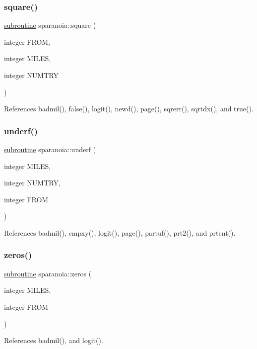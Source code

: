 \mbox{\label{sparanoia_8f90_a12b0d14b130071ecf4cd010e35b092c7}} 
\subsubsection{\texorpdfstring{square()}{square()}}
{\footnotesize\ttfamily \hyperlink{M__stopwatch_83_8txt_acfbcff50169d691ff02d4a123ed70482}{subroutine} sparanoia\+::square (\begin{DoxyParamCaption}\item[{integer}]{F\+R\+OM,  }\item[{integer}]{M\+I\+L\+ES,  }\item[{integer}]{N\+U\+M\+T\+RY }\end{DoxyParamCaption})}



References badmil(), false(), logit(), newd(), page(), sqrerr(), sqrtdx(), and true().

\mbox{\label{sparanoia_8f90_a147b84087576e0dcdf30b8e154e1422b}} 
\subsubsection{\texorpdfstring{underf()}{underf()}}
{\footnotesize\ttfamily \hyperlink{M__stopwatch_83_8txt_acfbcff50169d691ff02d4a123ed70482}{subroutine} sparanoia\+::underf (\begin{DoxyParamCaption}\item[{integer}]{M\+I\+L\+ES,  }\item[{integer}]{N\+U\+M\+T\+RY,  }\item[{integer}]{F\+R\+OM }\end{DoxyParamCaption})}



References badmil(), cmpxy(), logit(), page(), partuf(), prt2(), and prtcnt().

\mbox{\label{sparanoia_8f90_afbd0ce3d8d240b13d4a3746cc40f2619}} 
\subsubsection{\texorpdfstring{zeros()}{zeros()}}
{\footnotesize\ttfamily \hyperlink{M__stopwatch_83_8txt_acfbcff50169d691ff02d4a123ed70482}{subroutine} sparanoia\+::zeros (\begin{DoxyParamCaption}\item[{integer}]{M\+I\+L\+ES,  }\item[{integer}]{F\+R\+OM }\end{DoxyParamCaption})}



References badmil(), and logit().

